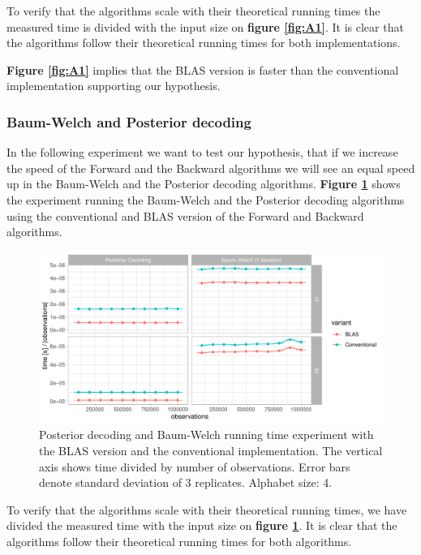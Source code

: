 To verify that the algorithms scale with their theoretical running times the measured time is divided with the input size on \textbf{figure \ref{fig:A1}}. It is clear that the algorithms follow their theoretical running times for both implementations. 

\textbf{Figure \ref{fig:A1}} implies that the BLAS version is faster than the conventional implementation supporting our hypothesis. 

\subsubsection{Baum-Welch and Posterior decoding}\label{sec:A2}

In the following experiment we want to test our hypothesis, that if we increase the speed of the Forward and the Backward algorithms we will see an equal speed up in the Baum-Welch and the Posterior decoding algorithms. \textbf{Figure \ref{fig:A2}} shows the experiment running the Baum-Welch and the Posterior decoding algorithms using the conventional and BLAS version of the Forward and Backward algorithms.

\begin{figure}[H]
  \centering
  \includegraphics[scale=0.85]{figures/figure_A2.pdf}
  \caption{\small{Posterior decoding and Baum-Welch running time experiment with the BLAS version and the conventional implementation. The vertical axis shows time divided by number of observations. Error bars denote standard deviation of 3 replicates. Alphabet size: 4.}}
  \label{fig:A2}
\end{figure}

To verify that the algorithms scale with their theoretical running times, we have divided the measured time with the input size on \textbf{figure \ref{fig:A2}}. It is clear that the algorithms follow their theoretical running times for both algorithms.

